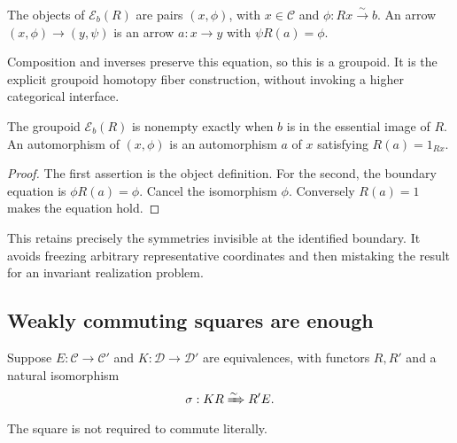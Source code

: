 \begin{definition}
The objects of \(\mathcal E_b(R)\) are pairs \((x,\phi)\), with \(x\in\mathcal C\) and \(\phi:Rx\xrightarrow{\sim}b\). An arrow \((x,\phi)\to(y,\psi)\) is an arrow \(a:x\to y\) with \(\psi R(a)=\phi\).
\end{definition}
Composition and inverses preserve this equation, so this is a groupoid. It is the explicit groupoid homotopy fiber construction, without invoking a higher categorical interface.

\begin{proposition}\label{KS38}
The groupoid \(\mathcal E_b(R)\) is nonempty exactly when \(b\) is in the essential image of \(R\). An automorphism of \((x,\phi)\) is an automorphism \(a\) of \(x\) satisfying \(R(a)=1_{Rx}\).
\end{proposition}
\begin{proof}
The first assertion is the object definition. For the second, the boundary equation is \(\phi R(a)=\phi\). Cancel the isomorphism \(\phi\). Conversely \(R(a)=1\) makes the equation hold.
\end{proof}
This retains precisely the symmetries invisible at the identified boundary. It avoids freezing arbitrary representative coordinates and then mistaking the result for an invariant realization problem.


\subsection{Weakly commuting squares are enough}
Suppose \(E:\mathcal C\to\mathcal C'\) and \(K:\mathcal D\to\mathcal D'\) are equivalences, with functors \(R,R'\) and a natural isomorphism
\[
 \sigma:KR\xRightarrow{\sim}R'E.
\]
The square is not required to commute literally.

